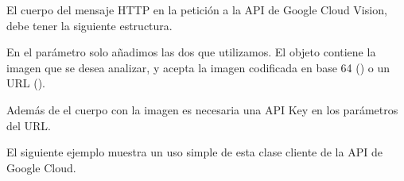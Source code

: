 El cuerpo del mensaje HTTP en la petición a la API de Google Cloud Vision,
debe tener la siguiente estructura.

\begin{sphinxVerbatim}[commandchars=\\\{\}]
   \PYG{p}{[}
       \PYG{p}{[}
           
           
      \PYG{p}{]}
       
         
         
           
  \PYG{p}{]}
\end{sphinxVerbatim}

En el parámetro  solo añadimos las dos que utilizamos. El objeto
 contiene la imagen que se desea analizar, y acepta la imagen codificada
en base 64 () o un URL ().

Además de el cuerpo con la imagen es necesaria una API Key en los parámetros
del URL.

El siguiente ejemplo muestra un uso simple de esta clase cliente de la API
de Google Cloud.

